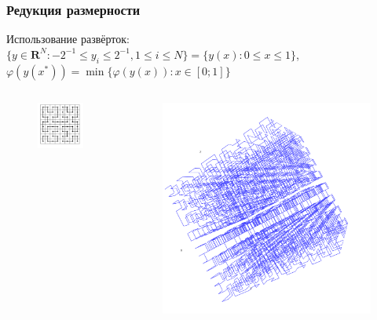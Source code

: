 \documentclass[aspectratio=1610]{beamer}
\begin{document}
\begin{frame}
  \frametitle{Редукция размерности}
     Использование развёрток:
    \(\lbrace y\in \mathbf{R}^N:-2^{-1}\leqslant y_i\leqslant 2^{-1},1\leqslant i\leqslant N\rbrace=\{y(x):0\leqslant x\leqslant 1\}\),
    \(\varphi(y(x^*))=\min\{\varphi(y(x)):x\in [0;1]\}\)

  \begin{columns}
    \begin{column}{0.5\textwidth}
      \begin{figure}[ht]
        \centerline{\includegraphics[width=.5\textwidth]{peano2d.png}}
      \end{figure}
    \end{column}
    \begin{column}{0.5\textwidth}
      \begin{figure}[ht]
      \centerline{\includegraphics[width=.6\textwidth]{peano3d.png}}

\end{figure}
\end{column}
\end{columns}
\end{frame}
\end{document}
